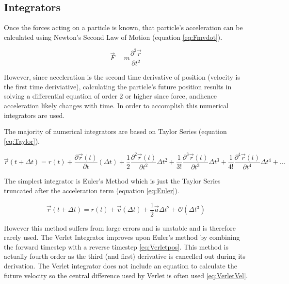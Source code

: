 \documentclass[12pt]{UoAthesis}
\begin{document}
\subsection{Integrators} 
Once the forces acting on a particle is known, that particle's
acceleration can be calculated using Newton's Second Law of Motion
(equation \ref{eq:Fmvdot}).

\begin{equation} 
  \vec{F} = m \frac{\partial^2 \vec{r}}{\partial t^2}
  \label{eq:Fmvdot} 
\end{equation}

However, since acceleration is the second time derivative of position
(velocity is the first time deriviative), calculating the particle's
future position results in solving a differential equation of order 2
or higher since force, andhence acceleration likely changes with
time. In order to accomplish this numerical integrators are used.

The majority of numerical integrators are based on Taylor Series
(equation \ref{eq:Taylor}).

\begin{equation} 
\vec{r}(t+\Delta t) = r(t) + 
\frac{\partial\vec{r}(t)}{\partial t}(\Delta t) + 
\frac{1}{2}\frac{\partial^2\vec{r}(t)}{\partial t^2}\Delta t^2 + 
\frac{1}{3!}\frac{\partial^3\vec{r}(t)}{\partial t^3}\Delta t^3 
+ \frac{1}{4!}\frac{\partial^4\vec{r}(t)}{\partial t^4}\Delta t^4 
+ ... \label{eq:Taylor} 
\end{equation}

The simplest integrator is Euler's Method which is just the Taylor
Series truncated after the acceleration term (equation
\ref{eq:Euler}).

\begin{equation} 
  \vec{r}(t+\Delta t) = r(t) + \vec{v}(\Delta t) +
  \frac{1}{2}\vec{a}\Delta t^2 + \mathcal{O}(\Delta t^3) 
  \label{eq:Euler}
\end{equation}

However this method suffers from large errors and is unstable
\cite{Haile1997} and is therefore rarely used. The Verlet Integrator
\cite{Verlet1967} improves upon Euler's method by combining the
forward timestep with a reverse timestep \eqref{eq:Verletpos}. This
method is actually fourth order as the third (and first) derivative is
cancelled out during its derivation. The Verlet integrator does not
include an equation to calculate the future velocity so the central
difference used by Verlet is often used \eqref{eq:VerletVel}.
\end{document}
